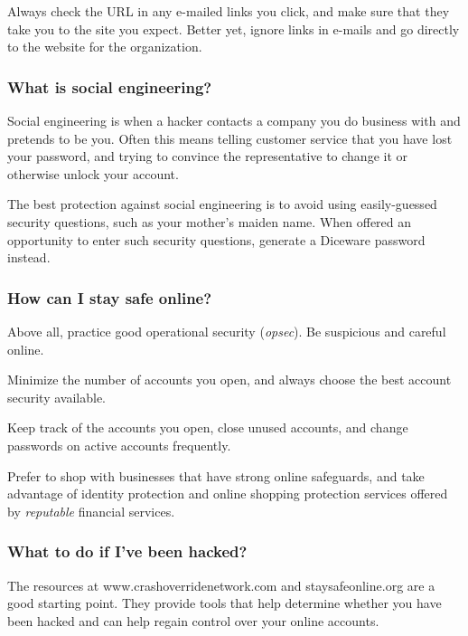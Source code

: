 Always check the URL in any e-mailed links you click, and make sure that they take you to the site you expect. Better yet, ignore links in e-mails and go directly to the website for the organization.

\subsubsection{What is social engineering?}

Social engineering is when a hacker contacts a company you do business with and pretends to be you. Often this means telling customer service that you have lost your password, and trying to convince the representative to change it or otherwise unlock your account.

The best protection against social engineering is to avoid using easily-guessed security questions, such as your mother's maiden name. When offered an opportunity to enter such security questions, generate a Diceware password instead.

\subsubsection{How can I stay safe online?}

Above all, practice good operational security (\textit{opsec}). Be suspicious and careful online.

Minimize the number of accounts you open, and always choose the best account security available.

Keep track of the accounts you open, close unused accounts, and change passwords on active accounts frequently.

Prefer to shop with businesses that have strong online safeguards, and take advantage of identity protection and online shopping protection services offered by \textit{reputable} financial services.

\subsubsection{What to do if I've been hacked?}

The resources at www.crashoverridenetwork.com and staysafeonline.org are a good starting point. They provide tools that help determine whether you have been hacked and can help regain control over your online accounts.
